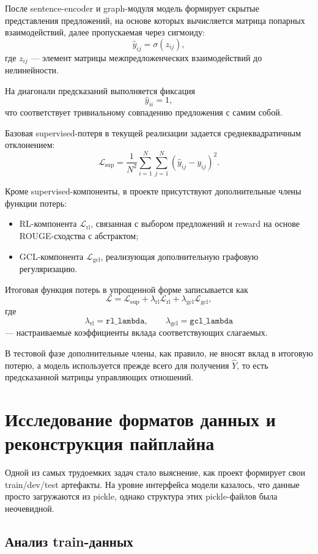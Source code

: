 \documentclass[12pt,a4paper]{article}
\begin{document}
После sentence-encoder и graph-модуля модель формирует скрытые представления предложений,
на основе которых вычисляется матрица попарных взаимодействий, далее пропускаемая через
сигмоиду:
\[
\hat{y}_{ij} = \sigma(z_{ij}),
\]
где $z_{ij}$ --- элемент матрицы межпредложенческих взаимодействий до нелинейности.

На диагонали предсказаний выполняется фиксация
\[
\hat{y}_{ii} = 1,
\]
что соответствует тривиальному совпадению предложения с самим собой.

Базовая supervised-потеря в текущей реализации задается среднеквадратичным отклонением:
\[
\mathcal{L}_{\text{sup}} =
\frac{1}{N^2}\sum_{i=1}^{N}\sum_{j=1}^{N}
\left(\hat{y}_{ij} - y_{ij}\right)^2.
\]

Кроме supervised-компоненты, в проекте присутствуют дополнительные члены функции потерь:

\begin{itemize}
    \item RL-компонента $\mathcal{L}_{\text{rl}}$, связанная с выбором предложений и
    reward на основе ROUGE-сходства с абстрактом;
    \item GCL-компонента $\mathcal{L}_{\text{gcl}}$, реализующая дополнительную графовую
    регуляризацию.
\end{itemize}

Итоговая функция потерь в упрощенной форме записывается как
\[
\mathcal{L} =
\mathcal{L}_{\text{sup}}
+ \lambda_{\text{rl}} \mathcal{L}_{\text{rl}}
+ \lambda_{\text{gcl}} \mathcal{L}_{\text{gcl}},
\]
где
\[
\lambda_{\text{rl}} = \texttt{rl\_lambda}, \qquad
\lambda_{\text{gcl}} = \texttt{gcl\_lambda}
\]
--- настраиваемые коэффициенты вклада соответствующих слагаемых.

В тестовой фазе дополнительные члены, как правило, не вносят вклад в итоговую потерю, а
модель используется прежде всего для получения $\hat{Y}$, то есть предсказанной матрицы
управляющих отношений.

\section{Исследование форматов данных и реконструкция пайплайна}

Одной из самых трудоемких задач стало выяснение, как проект формирует свои train/dev/test
артефакты. На уровне интерфейса модели казалось, что данные просто загружаются из pickle,
однако структура этих pickle-файлов была неочевидной.

\subsection{Анализ train-данных}
\end{document}
